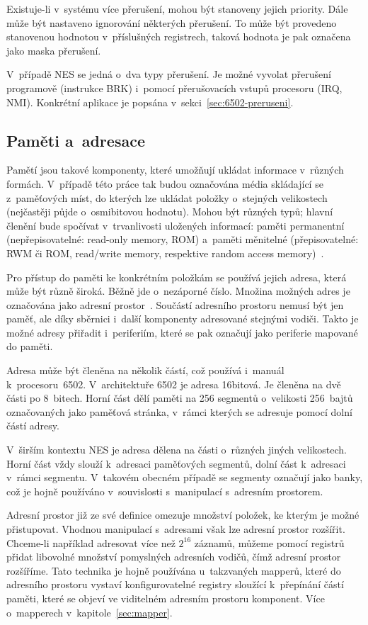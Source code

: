 Existuje-li v~systému více přerušení, mohou být stanoveny jejich priority. Dále může být nastaveno ignorování některých přerušení. To může být provedeno stanovenou hodnotou v~příslušných registrech, taková hodnota je pak označena jako maska přerušení.~\cite{Pluhacek1995:plp}

V~případě NES se jedná o~dva typy přerušení. Je možné vyvolat přerušení programově (instrukce BRK) i~pomocí přerušovacích vstupů procesoru (IRQ, NMI). Konkrétní aplikace je popsána v~sekci~\ref{sec:6502-preruseni}.

\subsection{Paměti a~adresace}
Pamětí jsou takové komponenty, které umožňují ukládat informace v~různých formách. V~případě této práce tak budou označována média skládající se z~paměťových míst, do kterých lze ukládat položky o~stejných velikostech (nejčastěji půjde o~osmibitovou hodnotu).  Mohou být různých typů; hlavní členění bude spočívat v~trvanlivosti uložených informací: paměti permanentní (nepřepisovatelné: read-only memory, ROM) a~paměti měnitelné (přepisovatelné: RWM či ROM, read/write memory, respektive random access memory)~\cite{Pluhacek1995:plp}.

Pro přístup do paměti ke konkrétním položkám se používá jejich adresa, která může být různě široká.  Běžně jde o~nezáporné číslo. Množina možných adres je označována jako adresní prostor~\cite{Pluhacek1995:plp}. Součástí adresního prostoru nemusí být jen paměť, ale díky sběrnici i~další komponenty adresované stejnými vodiči. Takto je možné adresy přiřadit i~periferiím, které se pak označují jako periferie mapované do paměti.

Adresa může být členěna na několik částí, což používá i~manuál k~procesoru~6502. V~architektuře 6502 je adresa 16bitová. Je členěna na dvě části po 8~bitech. Horní část dělí paměti na 256 segmentů o~velikosti 256~bajtů označovaných jako paměťová stránka, v~rámci kterých se adresuje pomocí dolní částí adresy.~\cite{mos:hw-manual}

V~širším kontextu NES je adresa dělena na části o~různých jiných velikostech. Horní část vždy slouží k~adresaci paměťových segmentů, dolní část k~adresaci v~rámci segmentu. V~takovém obecném případě se segmenty označují jako banky, což je hojně používáno v~souvislosti s~manipulací s~adresním prostorem.

Adresní prostor již ze své definice omezuje množství položek, ke kterým je možné přistupovat. Vhodnou manipulací s~adresami však lze adresní prostor rozšířit. Chceme-li například adresovat více než $2^{16}$ záznamů, můžeme pomocí registrů přidat libovolné množství pomyslných adresních vodičů, čímž adresní prostor rozšíříme. Tato technika je hojně používána u~takzvaných mapperů, které do adresního prostoru vystaví konfigurovatelné registry sloužící k~přepínání částí paměti, které se objeví ve viditelném adresním prostoru komponent. Více o~mapperech v~kapitole~\ref{sec:mapper}.

